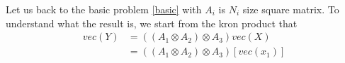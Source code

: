 Let us back to the basic problem \eqref{basic} with $A_i$ is $N_i$ size square matrix. To understand what the result is, we start from the kron product that 
\begin{align*}
    vec(Y) &= \left((A_1\otimes A_2)\otimes A_3\right)vec(X)\\
    &= \left((A_1\otimes A_2)\otimes A_3\right)[vec(x_1)]
\end{align*}


